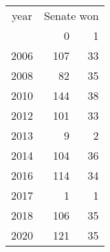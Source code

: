 \footnotesize\begin{tabular}[t]{lrr}
\toprule
\multicolumn{1}{c}{year} & \multicolumn{2}{c}{Senate won} \\
\cmidrule(l{3pt}r{3pt}){1-1} \cmidrule(l{3pt}r{3pt}){2-3}
  & 0 & 1\\
\midrule
2006 & 107 & 33\\
2008 & 82 & 35\\
2010 & 144 & 38\\
2012 & 101 & 33\\
2013 & 9 & 2\\
2014 & 104 & 36\\
2016 & 114 & 34\\
2017 & 1 & 1\\
2018 & 106 & 35\\
2020 & 121 & 35\\
\bottomrule
\end{tabular}
